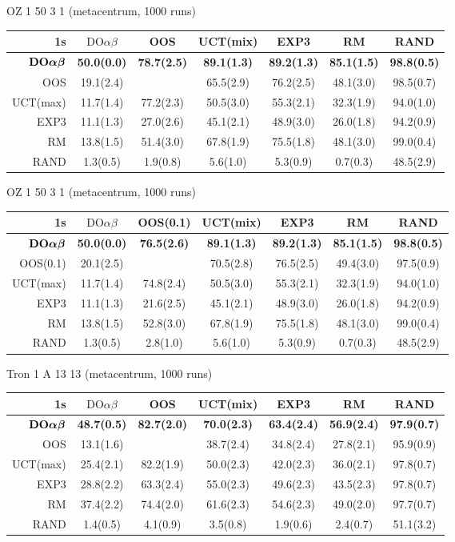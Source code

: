 \documentclass[preprint,12pt]{elsarticle}
\newcommand{\doab}[0]{\textrm{DO}\alpha\beta}
\newcommand{\bdoab}[0]{\textrm{\bf DO}\boldsymbol{\alpha\beta}}
\begin{document}
\begin{scriptsize}
OZ 1 50 3 1 (metacentrum, 1000 runs)\\
\begin{tabular}{|r|cccccc|}\hline
1s&$\doab$&OOS&UCT(mix)&EXP3&RM&RAND\\\hline
$\bdoab$&\textbf{50.0(0.0)}&\textbf{78.7(2.5)}&\textbf{89.1(1.3)}&\textbf{89.2(1.3)}&\textbf{85.1(1.5)}&\textbf{98.8(0.5)}\\
OOS&19.1(2.4)&&65.5(2.9)&76.2(2.5)&48.1(3.0)&98.5(0.7)\\
UCT(max)&11.7(1.4)&77.2(2.3)&50.5(3.0)&55.3(2.1)&32.3(1.9)&94.0(1.0)\\
EXP3&11.1(1.3)&27.0(2.6)&45.1(2.1)&48.9(3.0)&26.0(1.8)&94.2(0.9)\\
RM&13.8(1.5)&51.4(3.0)&67.8(1.9)&75.5(1.8)&48.1(3.0)&99.0(0.4)\\
RAND&1.3(0.5)&1.9(0.8)&5.6(1.0)&5.3(0.9)&0.7(0.3)&48.5(2.9)\\
\hline
\end{tabular}

OZ 1 50 3 1 (metacentrum, 1000 runs)\\
\begin{tabular}{|r|cccccc|}\hline
1s&$\doab$&OOS(0.1)&UCT(mix)&EXP3&RM&RAND\\\hline
$\bdoab$&\textbf{50.0(0.0)}&\textbf{76.5(2.6)}&\textbf{89.1(1.3)}&\textbf{89.2(1.3)}&\textbf{85.1(1.5)}&\textbf{98.8(0.5)}\\
OOS(0.1)&20.1(2.5)&&70.5(2.8)&76.5(2.5)&49.4(3.0)&97.5(0.9)\\
UCT(max)&11.7(1.4)&74.8(2.4)&50.5(3.0)&55.3(2.1)&32.3(1.9)&94.0(1.0)\\
EXP3&11.1(1.3)&21.6(2.5)&45.1(2.1)&48.9(3.0)&26.0(1.8)&94.2(0.9)\\
RM&13.8(1.5)&52.8(3.0)&67.8(1.9)&75.5(1.8)&48.1(3.0)&99.0(0.4)\\
RAND&1.3(0.5)&2.8(1.0)&5.6(1.0)&5.3(0.9)&0.7(0.3)&48.5(2.9)\\
\hline
\end{tabular}

Tron 1 A 13 13 (metacentrum, 1000 runs)\\
\begin{tabular}{|r|cccccc|}\hline
1s &$\doab$&OOS&UCT(mix)&EXP3&RM&RAND\\\hline
$\bdoab$&\textbf{48.7(0.5)}&\textbf{82.7(2.0)}&\textbf{70.0(2.3)}&\textbf{63.4(2.4)}&\textbf{56.9(2.4)}&\textbf{97.9(0.7)}\\
OOS&13.1(1.6)&&38.7(2.4)&34.8(2.4)&27.8(2.1)&95.9(0.9)\\
UCT(max)&25.4(2.1)&82.2(1.9)&50.0(2.3)&42.0(2.3)&36.0(2.1)&97.8(0.7)\\
EXP3&28.8(2.2)&63.3(2.4)&55.0(2.3)&49.6(2.3)&43.5(2.3)&97.8(0.7)\\
RM&37.4(2.2)&74.4(2.0)&61.6(2.3)&54.6(2.3)&49.0(2.0)&97.7(0.7)\\
RAND&1.4(0.5)&4.1(0.9)&3.5(0.8)&1.9(0.6)&2.4(0.7)&51.1(3.2)\\
\hline
\end{tabular}


\end{scriptsize}
\end{document}
